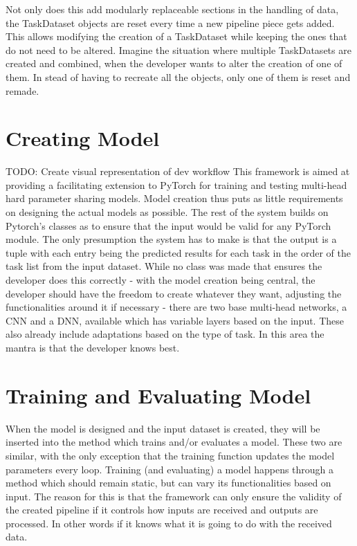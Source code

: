 Not only does this add modularly replaceable sections in the handling of data, the TaskDataset objects are reset every time a new pipeline piece gets added. This allows modifying the creation of a TaskDataset while keeping the ones that do not need to be altered. Imagine the situation where multiple TaskDatasets are created and combined, when the developer wants to alter the creation of one of them. In stead of having to recreate all the objects, only one of them is reset and remade. \\


\section{Creating Model} \label{Design:Model}
TODO: Create visual representation of dev workflow
This framework is aimed at providing a facilitating extension to PyTorch for training and testing multi-head hard parameter sharing models. Model creation thus puts as little requirements on designing the actual models as possible. The rest of the system builds on Pytorch's classes as to ensure that the input would be valid for any PyTorch module. The only presumption the system has to make is that the output is a tuple with each entry being the predicted results for each task in the order of the task list from the input dataset. While no class was made that ensures the developer does this correctly - with the model creation being central, the developer should have the freedom to create whatever they want, adjusting the functionalities around it if necessary - there are two base multi-head networks, a CNN and a DNN, available which has variable layers based on the input. These also already include adaptations based on the type of task. In this area the mantra is that the developer knows best. \\


\section{Training and Evaluating Model} \label{Design:Training}

When the model is designed and the input dataset is created, they will be inserted into the method which trains and/or evaluates a model. These two are similar, with the only exception that the training function updates the model parameters every loop. Training (and evaluating) a model happens through a method which should remain static, but can vary its functionalities based on input. The reason for this is that the framework can only ensure the validity of the created pipeline if it controls how inputs are received and outputs are processed. In other words if it knows what it is going to do with the received data. \\

